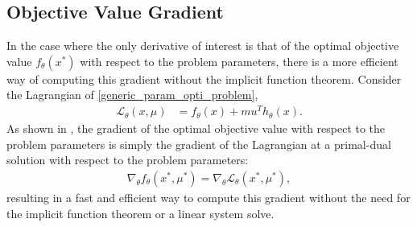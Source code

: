 \subsection{Objective Value Gradient}
%
In the case where the only derivative of interest is that of the optimal objective value $f_\theta(x^*)$ with respect to the problem parameters, there is a more efficient way of computing this gradient without the implicit function theorem. Consider the Lagrangian of \eqref{generic_param_opti_problem},
\begin{align}
    \mathcal{L}_\theta (x, \mu) &= f_\theta(x) + mu^Th_\theta(x). 
\end{align}
As shown in \cite{castillo2006}, the gradient of the optimal objective value with respect to the problem parameters is simply the gradient of the Lagrangian at a primal-dual solution with respect to the problem parameters:
\begin{align}
    \nabla_\theta f_\theta(x^*, \mu^*)= \nabla_\theta \mathcal{L}_\theta(x^*, \mu^*), \label{eq:lag_grad}
\end{align}
resulting in a fast and efficient way to compute this gradient without the need for the implicit function theorem or a linear system solve. 

